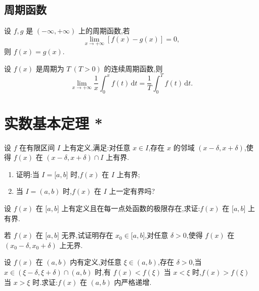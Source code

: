 \documentclass[../数学分析培优讲义.tex]{subfiles}
\begin{document}
\newpage

\subsection{周期函数}

\begin{example}
设 $f,g$ 是 $(-\infty,+\infty)$ 上的周期函数,若
\[
    \lim\limits_{x\to+\infty}[f(x)-g(x)]=0,
\]
则 $f(x)=g(x)$.
\end{example}
\exampleblank

\begin{example}
设 $f(x)$ 是周期为 $T\ (T>0)$ 的连续周期函数,则
\[
    \lim\limits_{x\to+\infty}
    \dfrac{1}{x}\int_0^x f(t)\,\mathrm{d}t
    =\dfrac{1}{T}\int_0^T f(t)\,\mathrm{d}t.
\]
\end{example}
\exampleblank


\newpage

\section{实数基本定理 *}

\begin{example}
设 $f$ 在有限区间 $I$ 上有定义,满足:对任意 $x\in I$,存在 $x$ 的邻域 $(x-\delta,x+\delta)$,使得 $f(x)$ 在 $(x-\delta,x+\delta)\cap I$ 上有界.
\begin{enumerate}[label=(\arabic*)]
    \item 证明:当 $I=\lbrack a,b\rbrack$ 时,$f(x)$ 在 $I$ 上有界;
    \item 当 $I=(a,b)$ 时,$f(x)$ 在 $I$ 上一定有界吗?
\end{enumerate}
\end{example}
\exampleblank

\begin{example}
设 $f(x)$ 在 $\lbrack a,b\rbrack$ 上有定义且在每一点处函数的极限存在,求证:$f(x)$ 在 $\lbrack a,b\rbrack$ 上有界.
\end{example}
\exampleblank

\begin{example}
若 $f(x)$ 在 $\lbrack a,b\rbrack$ 无界,试证明存在 $x_0\in\lbrack a,b\rbrack$,对任意 $\delta>0$,使得 $f(x)$ 在 $(x_0-\delta,x_0+\delta)$ 上无界.
\end{example}
\exampleblank

\begin{example}
设 $f(x)$ 在 $(a,b)$ 内有定义,对任意 $\xi\in(a,b)$,存在 $\delta>0$,当 $x\in(\xi-\delta,\xi+\delta)\cap(a,b)$ 时,有 $f(x)<f(\xi)$ 当 $x<\xi$ 时,$f(x)>f(\xi)$ 当 $x>\xi$ 时.求证:$f(x)$ 在 $(a,b)$ 内严格递增.
\end{example}
\exampleblank
\end{document}
